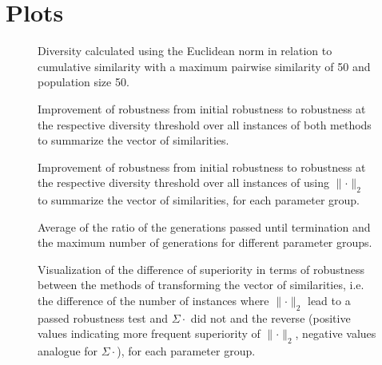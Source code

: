 \documentclass{article}
\begin{document}
\section{Plots}
\begin{figure}[H]
\centering
 \caption{Diversity calculated using the Euclidean norm in relation to cumulative similarity with a maximum pairwise similarity of 50 and population size 50.}
\vskip-8pt
\end{figure}
\begin{figure}[H]
\centering
 \caption{Improvement of robustness from initial robustness to robustness at the respective diversity threshold over all instances of both methods to summarize the vector of similarities.}
\vskip-8pt
\end{figure}
\begin{figure}[H]
\centering
 \caption{Improvement of robustness from initial robustness to robustness at the respective diversity threshold over all instances of using $\lVert \cdot \rVert_2$ to summarize the vector of similarities, for each parameter group.}
\vskip-8pt
\end{figure}
\begin{figure}[H]
\centering
 \caption{Average of the ratio of the generations passed until termination and the maximum number of generations for different parameter groups.}
\vskip-8pt
\end{figure}
\begin{figure}[H]
\centering
 \caption{Visualization of the difference of superiority in terms of robustness between the methods of transforming the vector of similarities, i.e. the difference of the number of instances where $\lVert \cdot \rVert _2$ lead to a passed robustness test and $\Sigma \cdot$ did not and the reverse (positive values indicating more frequent superiority of $\lVert \cdot \rVert_2$, negative values analogue for $\Sigma \cdot$), for each parameter group.}
\vskip-8pt
\end{figure}
\newpage
\end{document}
